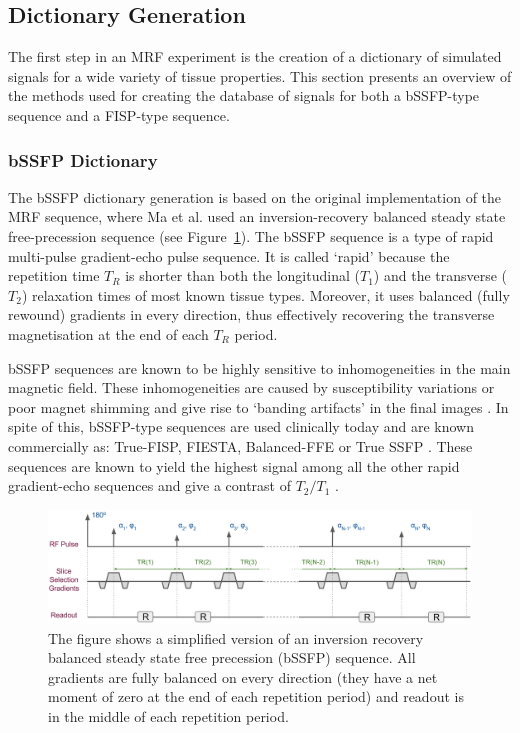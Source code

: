 \subsection{Dictionary Generation}
\label{method:dictionary}

The first step in an MRF experiment is the creation of a dictionary of simulated signals for a wide variety of tissue properties.
This section presents an overview of the methods used for creating the database of signals for both a bSSFP-type sequence and a FISP-type sequence.

\hfill

\subsubsection{bSSFP Dictionary}

The bSSFP dictionary generation is based on the original implementation of the MRF sequence, where Ma et al. \cite{Ma2013} used an inversion-recovery balanced steady state free-precession sequence (see Figure~\ref{fig:sequencebSSFP}). 
The bSSFP sequence is a type of rapid multi-pulse gradient-echo pulse sequence. 
It is called `rapid' because the repetition time $T_R$ is shorter than both the longitudinal ($T_1$) and the transverse ($T_2$) relaxation times of most known tissue types.
Moreover, it uses balanced (fully rewound) gradients in every direction, thus effectively recovering the transverse magnetisation at the end of each $T_R$ period.

\hfill

bSSFP sequences are known to be highly sensitive to inhomogeneities in the main magnetic field. 
These inhomogeneities are caused by susceptibility variations or poor magnet shimming and give rise to `banding artifacts' in the final images \cite{Hargreaves2012}.
In spite of this, bSSFP-type sequences are used clinically today and are known commercially as: True-FISP, FIESTA, Balanced-FFE or True SSFP \cite{Hargreaves2012}.
These sequences are known to yield the highest signal among all the other rapid gradient-echo sequences and give a contrast of $T_2/T_1$ \cite{Scheffler2003}.

\begin{figure}[ht]
    \centering
    \includegraphics[angle=0,width=1\textwidth, keepaspectratio]{images/mrf/sequencebSSFP}
    \caption{The figure shows a simplified version of an inversion recovery balanced steady state free precession (bSSFP) sequence. 
    All gradients are fully balanced on every direction (they have a net moment of zero at the end of each repetition period) and readout is in the middle of each repetition period.}
    \label{fig:sequencebSSFP}
\end{figure}

